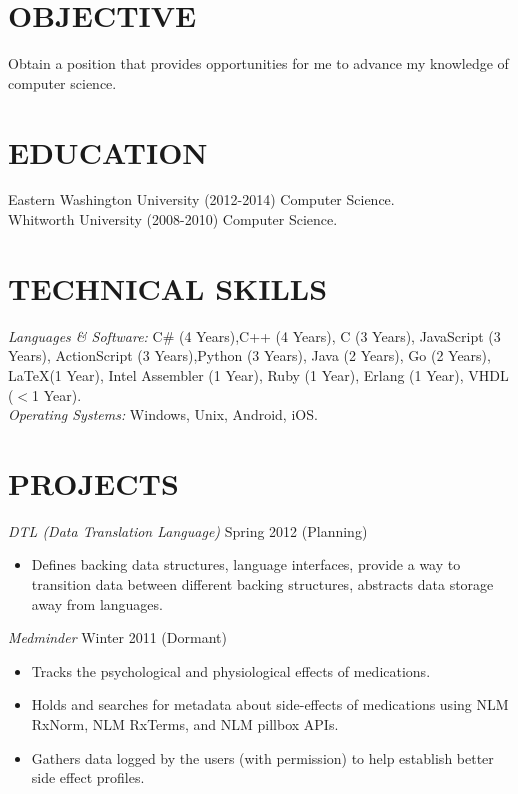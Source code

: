 \documentclass[line]{res}
\begin{document}

\address{ericfode@gmail.com}

 
\begin{resume}
 
\section{OBJECTIVE} Obtain a position that provides opportunities for me to advance my knowledge of computer science.

\section{EDUCATION}	Eastern Washington University (2012-2014) Computer Science.\\
					Whitworth University (2008-2010) Computer Science.
					
 
 
\section{TECHNICAL SKILLS} {\sl Languages \& Software:} C\# (4 Years),C++ (4 Years), C (3 Years), JavaScript (3 Years), ActionScript (3 Years),Python (3 Years), Java (2 Years), Go (2 Years), \LaTeX (1 Year), Intel Assembler (1 Year), Ruby (1 Year), Erlang (1 Year), VHDL ($<$1 Year).\\
{\sl Operating Systems:} Windows, Unix, Android, iOS.

                
\section{PROJECTS} 
				{\sl DTL (Data Translation Language)} \hfill Spring 2012 (Planning)
                 \begin{itemize}  \itemsep -2pt %
                 	\item Defines backing data structures, language interfaces, provide a way to transition data between different backing structures, abstracts data storage away from languages.
				 \end{itemize}
				{\sl Medminder} \hfill Winter 2011 (Dormant)
                 \begin{itemize}  \itemsep -2pt %
                	\item Tracks the psychological and physiological effects of medications.
                	\item Holds and searches for metadata about side-effects of medications using NLM RxNorm, NLM RxTerms, and NLM pillbox APIs.
                	\item Gathers data logged by the users (with permission) to help establish better side effect profiles.
                \end{itemize}

\end{resume}
\end{document}
